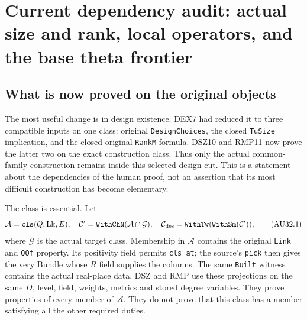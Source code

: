 \section{Current dependency audit: actual size and rank, local operators, and the base theta frontier}
\label{sec:dependency-audit-v32}


\subsection{What is now proved on the original objects}

The most useful change is in design existence. DEX7 had reduced it
to three compatible inputs on one class: original \texttt{DesignChoices},
the closed \texttt{TuSize} implication, and the closed original
\texttt{RankM} formula. DSZ10 and RMP11 now prove the latter two
on the exact construction class. Thus only the actual common-family
construction remains inside this selected design cut. This is a
statement about the dependencies of the human proof, not an assertion
that its most difficult construction has become elementary.

The class is essential. Let
\[
 \mathcal A=\texttt{cls}(Q,\mathrm{Lk},E),\quad
 \mathcal C'=\texttt{WithChN}(\mathcal A\cap\mathcal G),\quad
 \mathcal C_{\rm des}=\texttt{WithTw}(\texttt{WithSm}(\mathcal C')),
                                                               \tag{AU32.1}
\]
where $\mathcal G$ is the actual target class. Membership in
$\mathcal A$ contains the original \texttt{Link} and \texttt{QOf}
property. Its positivity field permits \texttt{cls\_at}; the
source's \texttt{pick} then gives the very Bundle whose $R$ field
supplies the columns. The same \texttt{Built} witness contains the
actual real-place data. DSZ and RMP use these projections on the
same $D$, level, field, weights, metrics and stored degree variables.
They prove properties of every member of $\mathcal A$.
They do not prove that this class has a member satisfying all the
other required duties.

